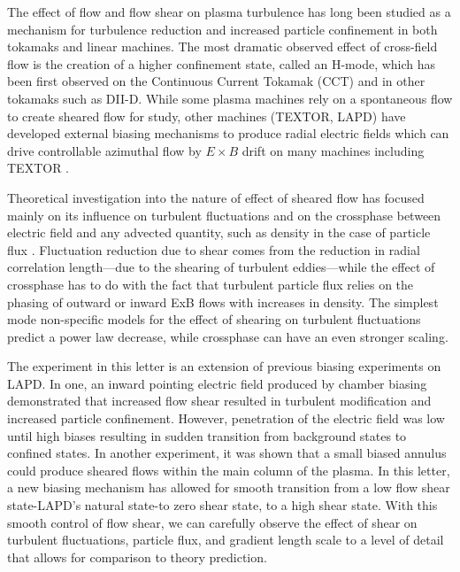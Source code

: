 \documentclass[%
 aps,
 prl,
 amsmath,amssymb,
 reprint,%
]{revtex4-1}
\begin{document}
\maketitle


The effect of flow and flow shear on plasma turbulence has long been studied as a mechanism for turbulence reduction and increased particle confinement in both tokamaks and linear machines.  The most dramatic observed effect of cross-field flow is the creation of a higher confinement state, called an H-mode, which has been first observed on the Continuous Current Tokamak (CCT) and in other tokamaks such as DII-D. While some plasma machines rely on a spontaneous flow to create sheared flow for study, other machines (TEXTOR, LAPD) have developed external biasing mechanisms to produce radial electric fields which can drive controllable azimuthal flow by $E \times B$ drift on many machines including TEXTOR \cite{boedo00}.

Theoretical investigation into the nature of effect of sheared flow has focused mainly on its influence on turbulent fluctuations \cite{biglari90} and on the crossphase between electric field and any advected quantity, such as density in the case of particle flux \cite{ware96,terry01}. Fluctuation reduction due to shear comes from the reduction in radial correlation length---due to the shearing of turbulent eddies---while the effect of crossphase has to do with the fact that turbulent particle flux relies on the phasing of outward or inward ExB flows with increases in density. The simplest mode non-specific models for the effect of shearing on turbulent fluctuations predict a power law decrease\cite{biglari90}, while crossphase can have an even stronger scaling\cite{terry01}.

The experiment in this letter is an extension of previous biasing experiments on LAPD. In one, an inward pointing electric field produced by chamber biasing demonstrated that increased flow shear resulted in turbulent modification and increased particle confinement\cite{carter09}. However, penetration of the electric field was low until high biases resulting in sudden transition from background states to confined states. In another experiment, it was shown that a small biased annulus could produce sheared flows within the main column of the plasma\cite{zhou12}. In this letter, a new biasing mechanism has allowed for smooth transition from a low flow shear state-LAPD's natural state-to zero shear state, to a high shear state. With this smooth control of flow shear, we can carefully observe the effect of shear on turbulent fluctuations, particle flux, and gradient length scale to a level of detail that allows for comparison to theory prediction.
\end{document}
